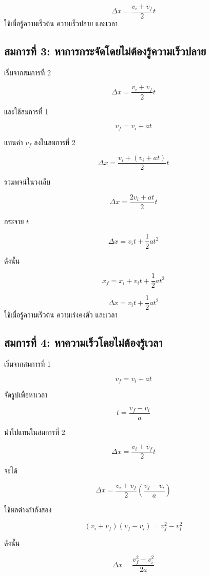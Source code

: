 \documentclass[12pt,a4paper]{report}
\begin{document}
\begin{tcolorbox}[title=สมการที่ 2]
\[
\Delta x=\frac{v_i+v_f}{2}t
\]
ใช้เมื่อรู้ความเร็วต้น ความเร็วปลาย และเวลา
\end{tcolorbox}

\subsection{สมการที่ 3: หาการกระจัดโดยไม่ต้องรู้ความเร็วปลาย}

เริ่มจากสมการที่ 2

\[
\Delta x=\frac{v_i+v_f}{2}t
\]

และใช้สมการที่ 1

\[
v_f=v_i+at
\]

แทนค่า $v_f$ ลงในสมการที่ 2

\[
\Delta x=\frac{v_i+(v_i+at)}{2}t
\]

รวมพจน์ในวงเล็บ

\[
\Delta x=\frac{2v_i+at}{2}t
\]

กระจาย $t$

\[
\Delta x=v_it+\frac{1}{2}at^2
\]

ดังนั้น

\[
x_f=x_i+v_it+\frac{1}{2}at^2
\]

\begin{tcolorbox}[title=สมการที่ 3]
\[
\Delta x=v_it+\frac{1}{2}at^2
\]
ใช้เมื่อรู้ความเร็วต้น ความเร่งคงตัว และเวลา
\end{tcolorbox}

\subsection{สมการที่ 4: หาความเร็วโดยไม่ต้องรู้เวลา}

เริ่มจากสมการที่ 1

\[
v_f=v_i+at
\]

จัดรูปเพื่อหาเวลา

\[
t=\frac{v_f-v_i}{a}
\]

นำไปแทนในสมการที่ 2

\[
\Delta x=\frac{v_i+v_f}{2}t
\]

จะได้

\[
\Delta x=\frac{v_i+v_f}{2}\left(\frac{v_f-v_i}{a}\right)
\]

ใช้ผลต่างกำลังสอง

\[
(v_i+v_f)(v_f-v_i)=v_f^2-v_i^2
\]

ดังนั้น

\[
\Delta x=\frac{v_f^2-v_i^2}{2a}
\]
\end{document}
